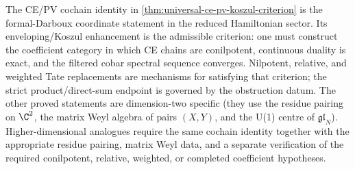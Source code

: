 \documentclass[11pt]{memoir}
\begin{document}
\begin{rmk}
  The CE/PV cochain identity in
  \ref{thm:universal-ce-pv-koszul-criterion} is the formal-Darboux
  coordinate statement in the reduced Hamiltonian sector.  Its
  enveloping/Koszul
  enhancement is the admissible criterion: one must construct the
  coefficient category in which CE chains are conilpotent, continuous
  duality is exact, and the filtered cobar spectral sequence converges.
  Nilpotent, relative, and weighted Tate replacements are mechanisms for
  satisfying that criterion; the strict product/direct-sum endpoint is
  governed by the obstruction datum.
  The other proved statements are dimension-two specific (they use the
  residue pairing on $\C^2$, the matrix Weyl algebra of pairs $(X,Y)$,
  and the U(1) centre of $\mathfrak{gl}_N$). Higher-dimensional analogues
  require the same cochain identity together with the appropriate residue
  pairing, matrix Weyl data, and a separate verification of the required
  conilpotent, relative, weighted, or completed coefficient hypotheses.
\end{rmk}
\end{document}
